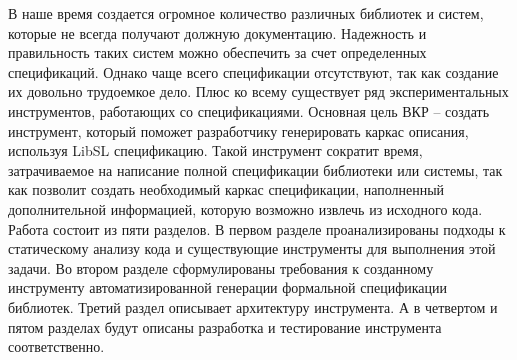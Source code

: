 \intro

В наше время создается огромное количество различных библиотек и систем, которые не всегда получают должную документацию. Надежность и правильность таких систем можно обеспечить за счет определенных спецификаций.
Однако чаще всего спецификации отсутствуют, так как создание их довольно трудоемкое дело. Плюс ко всему существует ряд экспериментальных инструментов, работающих со спецификациями.
Основная цель ВКР – создать инструмент, который поможет разработчику генерировать каркас описания, используя LibSL спецификацию. Такой инструмент сократит время, затрачиваемое на написание полной спецификации библиотеки или системы, так как позволит создать необходимый каркас спецификации, наполненный дополнительной информацией, которую возможно извлечь из исходного кода.
Работа состоит из пяти разделов. В первом разделе проанализированы подходы к статическому анализу кода и существующие инструменты для выполнения этой задачи. Во втором разделе сформулированы требования к созданному инструменту автоматизированной генерации формальной спецификации библиотек. Третий раздел описывает архитектуру инструмента. А в четвертом и пятом разделах будут описаны разработка и тестирование инструмента соответственно.

